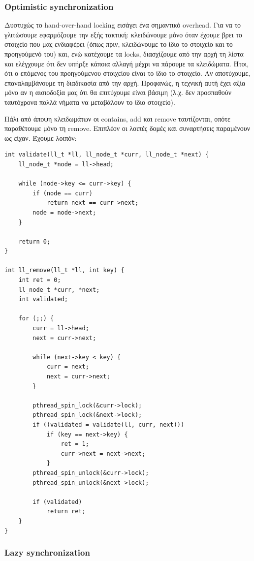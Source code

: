 \documentclass[12pt,titlepage]{article}
\begin{document}
\subsubsection{Optimistic synchronization}

Δυστυχώς το hand-over-hand locking εισάγει ένα σημαντικό overhead. Για να το
γλιτώσουμε εφαρμόζουμε την εξής τακτική: κλειδώνουμε μόνο όταν έχουμε βρει το
στοιχείο που μας ενδιαφέρει (όπως πριν, κλειδώνουμε το ίδιο το στοιχείο και το
προηγούμενό του) και, ενώ κατέχουμε τα locks, διασχίζουμε από την αρχή τη λίστα
και ελέγχουμε ότι δεν υπήρξε κάποια αλλαγή μέχρι να πάρουμε τα κλειδώματα. Ήτοι,
ότι ο επόμενος του προηγούμενου στοιχείου είναι το ίδιο το στοιχείο. Αν
αποτύχουμε, επαναλαμβάνουμε τη διαδικασία από την αρχή. Προφανώς, η τεχνική αυτή
έχει αξία μόνο αν η αισιοδοξία μας ότι θα επιτύχουμε είναι βάσιμη (λ.χ. δεν
προσπαθούν ταυτόχρονα πολλά νήματα να μεταβάλουν το ίδιο στοιχείο).

Πάλι από άποψη κλειδωμάτων οι contains, add και remove ταυτίζονται, οπότε
παραθέτουμε μόνο τη remove. Επιπλέον οι λοιπές δομές και συναρτήσεις παραμένουν
ως είχαν. Έχουμε λοιπόν:

\begin{verbatim}
int validate(ll_t *ll, ll_node_t *curr, ll_node_t *next) {
    ll_node_t *node = ll->head;

    while (node->key <= curr->key) {
        if (node == curr)
            return next == curr->next;
        node = node->next;
    }

    return 0;
}

int ll_remove(ll_t *ll, int key) {
    int ret = 0;
    ll_node_t *curr, *next;
    int validated;

    for (;;) {
        curr = ll->head;
        next = curr->next;

        while (next->key < key) {
            curr = next;
            next = curr->next;
        }

        pthread_spin_lock(&curr->lock);
        pthread_spin_lock(&next->lock);
        if ((validated = validate(ll, curr, next)))
            if (key == next->key) {
                ret = 1;
                curr->next = next->next;
            }
        pthread_spin_unlock(&curr->lock);
        pthread_spin_unlock(&next->lock);

        if (validated)
            return ret;
    }
}
\end{verbatim}

\subsubsection{Lazy synchronization}
\end{document}
